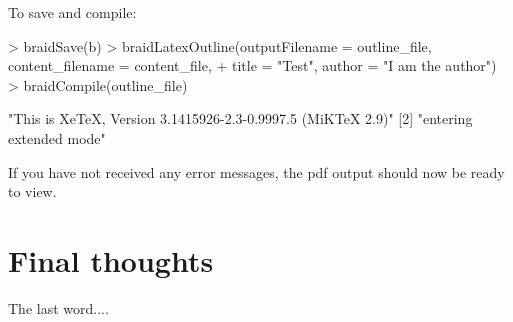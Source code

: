 \documentclass[a4paper]{article}
\begin{document}
To save and compile:

\begin{Schunk}
\begin{Sinput}
> braidSave(b)
> braidLatexOutline(outputFilename = outline_file, content_filename = content_file, 
+     title = "Test", author = "I am the author")
> braidCompile(outline_file)
\end{Sinput}
\begin{Soutput}
[1] "This is XeTeX, Version 3.1415926-2.3-0.9997.5 (MiKTeX 2.9)"
[2] "entering extended mode"                                    
\end{Soutput}
\end{Schunk}

If you have not received any error messages, the pdf output should now be ready to view.


\section{Final thoughts}

The last word....


\end{document}
